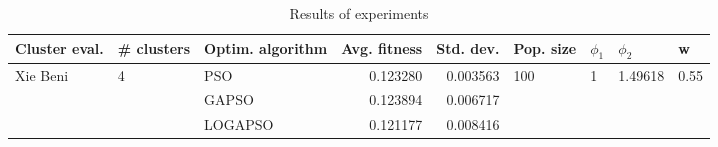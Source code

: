 \begin{table}
\centering
\caption{Results of experiments}
\begin{tabular}{lllrrllll}
\toprule
            Cluster eval. &        \# clusters & Optim. algorithm &  Avg. fitness &  Std. dev. &            Pop. size &         $\phi_{1}$ &               $\phi_{2}$ &                     w \\
\midrule
\multirow{3}{*}{Xie Beni} & \multirow{3}{*}{4} &              PSO &      0.123280 &   0.003563 & \multirow{3}{*}{100} & \multirow{3}{*}{1} & \multirow{3}{*}{1.49618} & \multirow{3}{*}{0.55} \\
                          &                    &            GAPSO &      0.123894 &   0.006717 &                      &                    &                          &                       \\
                          &                    &          LOGAPSO &      0.121177 &   0.008416 &                      &                    &                          &                       \\
\bottomrule
\end{tabular}
\end{table}
